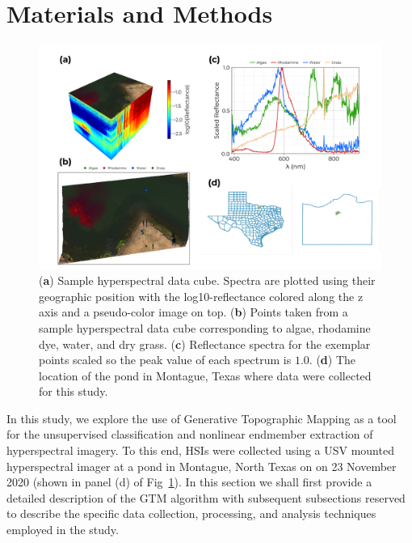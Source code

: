 \documentclass[remotesensing,article,submit,pdftex,moreauthors]{Definitions/mdpi}
\begin{document}
\section{Materials and Methods}


\begin{figure}[t]
\centering
\includegraphics[width=\columnwidth]{paper/figures/methods/sample-spectra.pdf}
\caption{(\textbf{a}) Sample hyperspectral data cube. Spectra are plotted using their geographic position with the log10-reflectance colored along the z axis and a pseudo-color image on top. (\textbf{b}) Points taken from a sample hyperspectral data cube corresponding to algae, rhodamine dye, water, and dry grass. (\textbf{c}) Reflectance spectra for the exemplar points scaled so the peak value of each spectrum is $1.0$. (\textbf{d}) The location of the pond in Montague, Texas where data were collected for this study.\label{fig:sample-spectra}}
\end{figure}  

In this study, we explore the use of Generative Topographic Mapping as a tool for the unsupervised classification and nonlinear endmember extraction of hyperspectral imagery. To this end, HSIs were collected using a USV mounted hyperspectral imager at a pond in Montague, North Texas on on 23 November 2020 (shown in panel (d) of Fig~\ref{fig:sample-spectra}). In this section we shall first provide a detailed description of the GTM algorithm with subsequent subsections reserved to describe the specific data collection, processing, and analysis techniques employed in the study.
\end{document}
